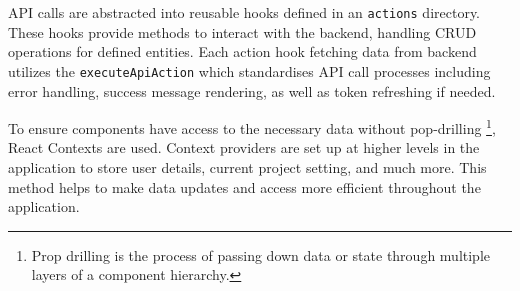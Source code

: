 API calls are abstracted into reusable hooks defined in an \texttt{actions} directory.
These hooks provide methods to interact with the backend, handling CRUD operations for defined entities.
Each action hook fetching data from backend utilizes the \texttt{executeApiAction} which standardises API call processes including error handling, success message rendering, as well as token refreshing if needed.

To ensure components have access to the necessary data without pop-drilling \footnote{Prop drilling is the process of passing down data or state through multiple layers of a component hierarchy.}, React Contexts are used.
Context providers are set up at higher levels in the application to store user details, current project setting, and much more.
This method helps to make data updates and access more efficient throughout the application. 




